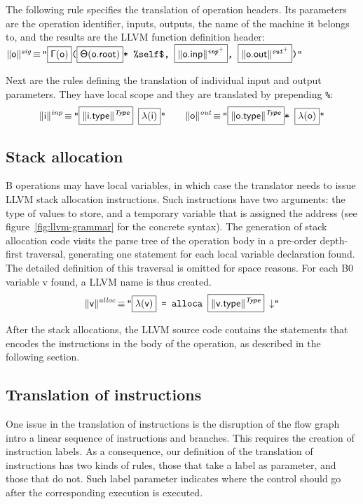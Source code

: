 \documentclass{llncs}
\newcommand{\trad}[2]{\ensuremath{\lVert \textsf{#1} \rVert^{\textit{#2}}}}
\newcommand{\nl}[0]{\ensuremath{\downarrow}}
\DeclareMathOperator{\isdef}{\equiv}
\newcommand{\llvm}[1]{\texttt{#1}}
\newcommand{\B}[1]{\textsf{#1}}
\newcommand{\ListOf}[1]{$\mbox{#1}^+$}
\newcommand{\PH}[1]{\framebox{$#1$}}
\newcommand{\Global}[0]{\ensuremath{\sf\Gamma}}
\newcommand{\local}[0]{\ensuremath{\sf\lambda}}
\newcommand{\state}[0]{\ensuremath{\sf\Theta}}
\newcommand{\self}[0]{\llvm{\%self\$}}
\begin{document}
The following rule specifies the translation of operation headers. Its
parameters are the operation identifier, inputs, outputs, the name of the
machine it belongs to, and the results are the LLVM function definition
header: \\
\noindent$\trad{\B{o}}{sig} \isdef \llvm{"\PH{\Global(\B{o})}(\PH{\state(\B{o.root})}* \self, \PH{\trad{\B{o.inp}}{\ListOf{inp}}}, \PH{\trad{\B{o.out}}{\ListOf{out}}})"}$

Next are the rules defining the translation of individual input and output
parameters. They have local scope and they are translated by prepending
\llvm{\%}:
\begin{align*}
  \trad{i}{inp} \isdef
  \llvm{"\PH{\trad{i.type}{\B{Type}}} \PH{\local(\B{i})}"} \quad \quad
  \trad{o}{out} \isdef
  \llvm{"\PH{\trad{o.type}{\B{Type}}}* \PH{\local(\B{o})}"}
\end{align*}

\subsection{Stack allocation}
\label{sec:trad-alloc}

B operations may have local variables, in which case the translator needs to
issue LLVM stack allocation instructions. Such instructions have two arguments:
the type of values to store, and a temporary variable that is assigned the
address (see figure~\ref{fig:llvm-grammar} for the concrete syntax). The
generation of stack allocation code visits the parse tree of the operation body
in a pre-order depth-first traversal, generating one statement for each local
variable declaration found. The detailed definition of this traversal is omitted
for space reasons. For each B0 variable \B{v} found, a LLVM name is thus
created.
\begin{align*}
  \trad{v}{alloc} \isdef
  \llvm{"\PH{\local(\B{v})} = alloca \PH{\trad{v.type}{\B{Type}}} \nl"}
\end{align*}

After the stack allocations, the LLVM source code contains the statements that
encodes the instructions in the body of the operation, as described in the
following section.

\subsection{Translation of instructions}
\label{sec:trad-instr}

One issue in the translation of instructions is the disruption of the flow graph
intro a linear sequence of instructions and branches. This requires the creation
of instruction labels. As a consequence, our definition of the translation of
instructions has two kinds of rules, those that take a label as parameter, and
those that do not. Such label parameter indicates where the control should go
after the corresponding execution is executed.
\end{document}
